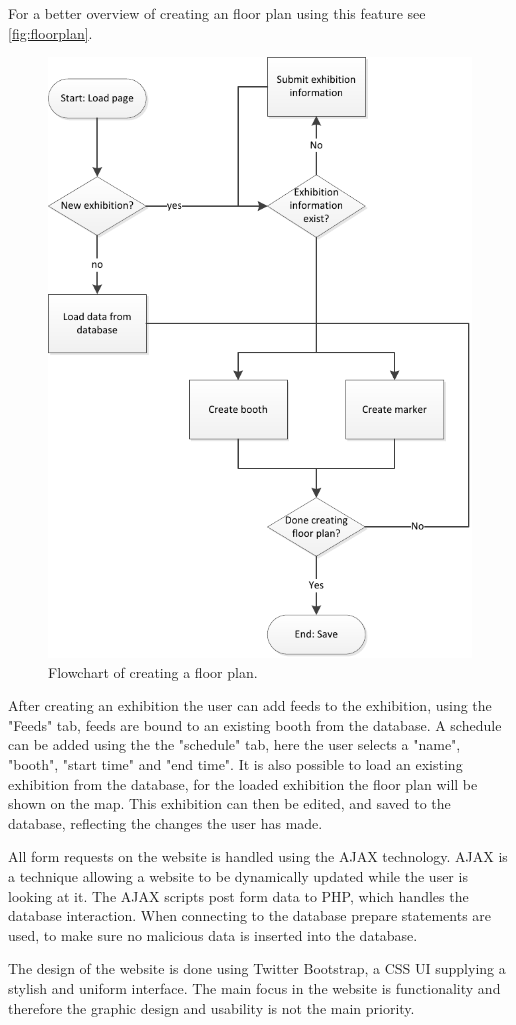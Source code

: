 For a better overview of creating an floor plan using this feature see \autoref{fig:floorplan}.
\begin{figure}[H]
	\centering
	\includegraphics[scale=0.5]{img/floorplanflow.pdf}
	\caption{Flowchart of creating a floor plan.\label{fig:floorplan}}
\end{figure}


After creating an exhibition the user can add feeds to the exhibition, using the "Feeds" tab, feeds are bound to an existing booth from the database. A schedule can be added using the the "schedule" tab, here the user selects a "name", "booth", "start time" and "end time".
It is also possible to load an existing exhibition from the database, for the loaded exhibition the floor plan will be shown on the map. This exhibition can then be edited, and saved to the database, reflecting the changes the user has made.


All form requests on the website is handled using the AJAX technology\citep{ajax}. AJAX is a technique allowing a website to be dynamically updated while the user is looking at it.
The AJAX scripts post form data to PHP, which handles the database interaction. When connecting to the database prepare statements are used, to make sure no malicious data is inserted into the database.


The design of the website is done using Twitter Bootstrap\citep{twitterbootstrap}, a CSS UI supplying a stylish and uniform interface.
The main focus in the website is functionality and therefore the graphic design and usability is not the main priority.